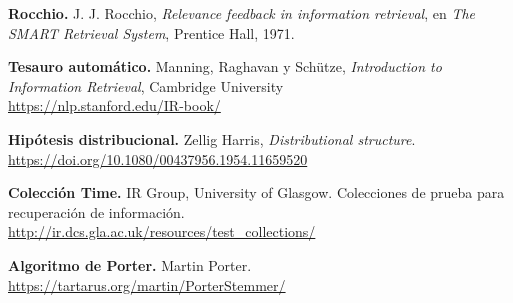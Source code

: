 \documentclass[11pt,letterpaper]{article}
\begin{document}
\begin{enumerate}[label={[\arabic*]}, itemsep=0.3em, leftmargin=*]
    \item \textbf{Rocchio.} J. J. Rocchio,
          \emph{Relevance feedback in information retrieval}, en
          \emph{The SMART Retrieval System}, Prentice Hall, 1971.\\
    \item \textbf{Tesauro automático.} Manning, Raghavan y Schütze,
          \emph{Introduction to Information Retrieval}, Cambridge
          University\\
          \url{https://nlp.stanford.edu/IR-book/}\\
    \item \textbf{Hipótesis distribucional.} Zellig Harris,
          \emph{Distributional structure}.\\
          \url{https://doi.org/10.1080/00437956.1954.11659520}\\
    \item \textbf{Colección Time.} IR Group, University of Glasgow.
          Colecciones de prueba para recuperación de información.\\
          \url{http://ir.dcs.gla.ac.uk/resources/test_collections/}
    \item \textbf{Algoritmo de Porter.} Martin Porter.\\
          \url{https://tartarus.org/martin/PorterStemmer/}
\end{enumerate}

\appendix
\end{document}
